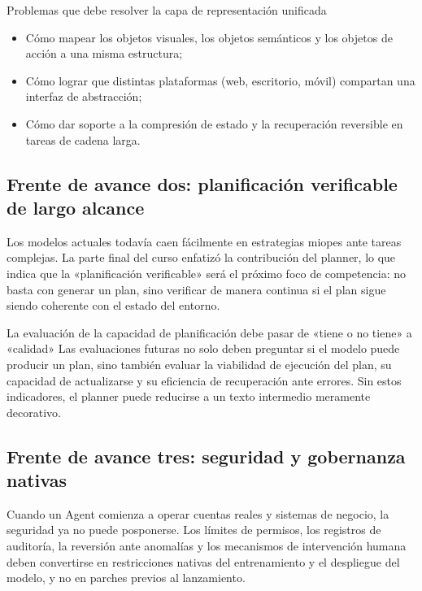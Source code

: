 \documentclass[a4paper]{article}
\begin{document}
\begin{knowledgebox}{Problemas que debe resolver la capa de representación unificada}
\begin{itemize}
    \item Cómo mapear los objetos visuales, los objetos semánticos y los objetos de acción a una misma estructura;
    \item Cómo lograr que distintas plataformas (web, escritorio, móvil) compartan una interfaz de abstracción;
    \item Cómo dar soporte a la compresión de estado y la recuperación reversible en tareas de cadena larga.
\end{itemize}
\end{knowledgebox}

\subsection{Frente de avance dos: planificación verificable de largo alcance}
Los modelos actuales todavía caen fácilmente en estrategias miopes ante tareas complejas. La parte final del curso enfatizó la contribución del planner, lo que indica que la «planificación verificable» será el próximo foco de competencia: no basta con generar un plan, sino verificar de manera continua si el plan sigue siendo coherente con el estado del entorno.

\begin{importantbox}{La evaluación de la capacidad de planificación debe pasar de «tiene o no tiene» a «calidad»}
Las evaluaciones futuras no solo deben preguntar si el modelo puede producir un plan, sino también evaluar la viabilidad de ejecución del plan, su capacidad de actualizarse y su eficiencia de recuperación ante errores. Sin estos indicadores, el planner puede reducirse a un texto intermedio meramente decorativo.
\end{importantbox}

\subsection{Frente de avance tres: seguridad y gobernanza nativas}
Cuando un Agent comienza a operar cuentas reales y sistemas de negocio, la seguridad ya no puede posponerse. Los límites de permisos, los registros de auditoría, la reversión ante anomalías y los mecanismos de intervención humana deben convertirse en restricciones nativas del entrenamiento y el despliegue del modelo, y no en parches previos al lanzamiento.
\end{document}
